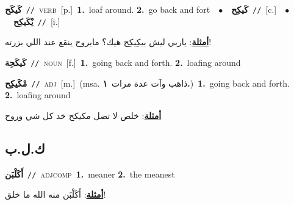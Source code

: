\documentclass[10pt,a4paper,twoside]{article} %
\begin{document}
\begin{multicols}{2}
{\setlength\topsep{0pt}\textbf{\foreignlanguage{arabic}{كَيكَح}}\ {\color{gray}\texttt{//}\color{black}}\ \textsc{verb}\ [p.]\ \textbf{1.}~loaf around.  \textbf{2.}~go back and fort\ \ $\bullet$\ \ \setlength\topsep{0pt}\textbf{\foreignlanguage{arabic}{كَيكِح}}\ {\color{gray}\texttt{//}\color{black}}\ [c.]\ \ $\bullet$\ \ \setlength\topsep{0pt}\textbf{\foreignlanguage{arabic}{يْكَيكِح}}\ {\color{gray}\texttt{//}\color{black}}\ [i.]\  \begin{flushright}\color{gray}\foreignlanguage{arabic}{\textbf{\underline{\foreignlanguage{arabic}{أمثلة}}}: ياربي ليش بيكِيكِح هيك؟ مايروح ينقع عند اللي بزرته!}\end{flushright}\color{black}} \vspace{2mm}

{\setlength\topsep{0pt}\textbf{\foreignlanguage{arabic}{كَيكَحِة}}\ {\color{gray}\texttt{//}\color{black}}\ \textsc{noun}\ [f.]\ \textbf{1.}~going back and forth.  \textbf{2.}~loafing around\ } \vspace{2mm}

{\setlength\topsep{0pt}\textbf{\foreignlanguage{arabic}{مْكَيكِح}}\ {\color{gray}\texttt{//}\color{black}}\ \textsc{adj}\ [m.]\ \color{gray}(msa. \foreignlanguage{arabic}{ذاهب وآت عدة مرات}~\foreignlanguage{arabic}{\textbf{١.}})\color{black}\ \textbf{1.}~going back and forth.  \textbf{2.}~loafing around\  \begin{flushright}\color{gray}\foreignlanguage{arabic}{\textbf{\underline{\foreignlanguage{arabic}{أمثلة}}}: خلص لا تضل مكيكح خد كل شي وروح}\end{flushright}\color{black}} \vspace{2mm}

\vspace{-3mm}
\subsection*{\color{blue}\foreignlanguage{arabic}{ك.ل.ب}\color{blue}{}} 

{\setlength\topsep{0pt}\textbf{\foreignlanguage{arabic}{أَكَلْبَن}}\ {\color{gray}\texttt{//}\color{black}}\ \textsc{adj\textunderscore comp}\ \textbf{1.}~meaner  \textbf{2.}~the meanest\  \begin{flushright}\color{gray}\foreignlanguage{arabic}{\textbf{\underline{\foreignlanguage{arabic}{أمثلة}}}: أَكَلْبَن منه الله ما خلق!}\end{flushright}\color{black}} \vspace{2mm}


\end{multicols}
\end{document}
